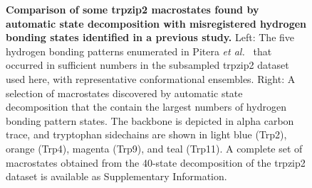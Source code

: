 \begin{figure}[tb]
  \begin{center}
  \end{center}
  \caption{{\bf Comparison of some trpzip2 macrostates found by automatic state decomposition with misregistered hydrogen bonding states identified in a previous study.}  
  Left: The five hydrogen bonding patterns enumerated in Pitera \emph{et al.\ } \cite{pitera:2006a} that occurred in sufficient numbers in the subsampled trpzip2 dataset used here, with representative conformational ensembles.  
  Right: A selection of macrostates discovered by automatic state decomposition that the contain the largest numbers of hydrogen bonding pattern states.  
  The backbone is depicted in alpha carbon trace, and tryptophan sidechains are shown in light blue (Trp2), orange (Trp4), magenta (Trp9), and teal (Trp11).
  A complete set of macrostates obtained from the 40-state decomposition of the trpzip2 dataset is available as Supplementary Information.
  }
  \label{automatic:figure:trpzip2-states}
\end{figure}

